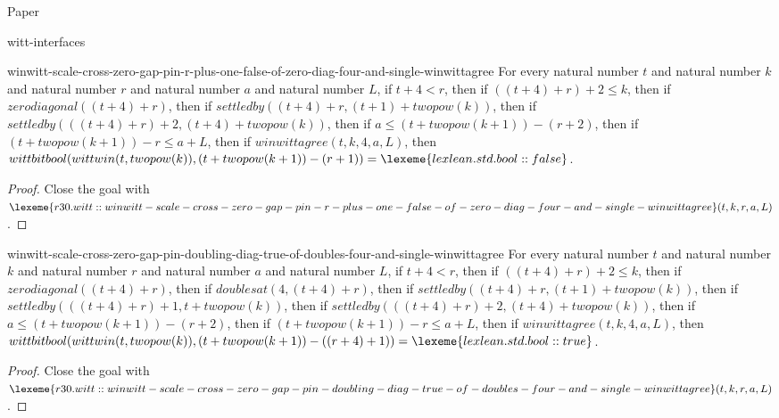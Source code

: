 \begin{lexlean}{Paper}
\begin{section}{witt-interfaces}
  \begin{theorem}{winwitt-scale-cross-zero-gap-pin-r-plus-one-false-of-zero-diag-four-and-single-winwittagree}
  For every natural number \(t\) and natural number \(k\) and natural number \(r\) and natural number \(a\) and natural number \(L\), if \(t + 4 < r\), then if \(((t + 4) + r) + 2 ≤ k\), then if \(zerodiagonal((t + 4) + r)\), then if \(settledby((t + 4) + r, (t + 1) + twopow(k))\), then if \(settledby(((t + 4) + r) + 2, (t + 4) + twopow(k))\), then if \(a ≤ (t + twopow(k + 1)) - (r + 2)\), then if \((t + twopow(k + 1)) - r ≤ a + L\), then if \(winwittagree(t, k, 4, a, L)\), then \(wittbitbool(wittwin(t, twopow(k)), (t + twopow(k + 1)) - (r + 1)) = \lexeme{lexlean.std.bool::false}\).
  \begin{proof}
  Close the goal with \(\lexeme{r30.witt::winwitt-scale-cross-zero-gap-pin-r-plus-one-false-of-zero-diag-four-and-single-winwittagree}(t, k, r, a, L)\).
  \end{proof}
  \end{theorem}

  \begin{theorem}{winwitt-scale-cross-zero-gap-pin-doubling-diag-true-of-doubles-four-and-single-winwittagree}
  For every natural number \(t\) and natural number \(k\) and natural number \(r\) and natural number \(a\) and natural number \(L\), if \(t + 4 < r\), then if \(((t + 4) + r) + 2 ≤ k\), then if \(zerodiagonal((t + 4) + r)\), then if \(doublesat(4, (t + 4) + r)\), then if \(settledby((t + 4) + r, (t + 1) + twopow(k))\), then if \(settledby(((t + 4) + r) + 1, t + twopow(k))\), then if \(settledby(((t + 4) + r) + 2, (t + 4) + twopow(k))\), then if \(a ≤ (t + twopow(k + 1)) - (r + 2)\), then if \((t + twopow(k + 1)) - r ≤ a + L\), then if \(winwittagree(t, k, 4, a, L)\), then \(wittbitbool(wittwin(t, twopow(k)), (t + twopow(k + 1)) - ((r + 4) + 1)) = \lexeme{lexlean.std.bool::true}\).
  \begin{proof}
  Close the goal with \(\lexeme{r30.witt::winwitt-scale-cross-zero-gap-pin-doubling-diag-true-of-doubles-four-and-single-winwittagree}(t, k, r, a, L)\).
  \end{proof}
  \end{theorem}


\end{section}
\end{lexlean}
